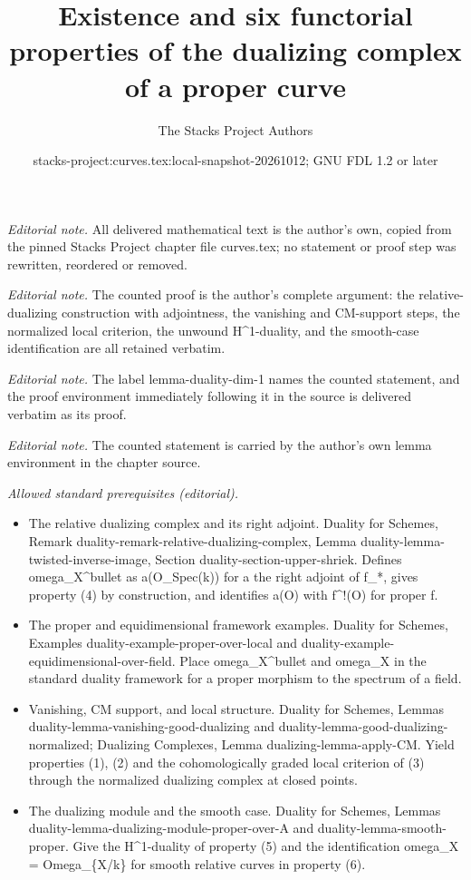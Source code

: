 \documentclass[10pt,a4paper]{amsart}
\title{Existence and six functorial properties of the dualizing complex of a proper curve}
\author{The Stacks Project Authors}
\date{stacks-project:curves.tex:local-snapshot-20261012; GNU FDL 1.2 or later}
\theoremstyle{plain}
\theoremstyle{definition}
\theoremstyle{remark}
\numberwithin{equation}{subsection}
\begin{document}
\maketitle
\noindent\textit{Editorial note.} All delivered mathematical text is the author's own, copied from the pinned Stacks Project chapter file curves.tex; no statement or proof step was rewritten, reordered or removed.\par\medskip
\noindent\textit{Editorial note.} The counted proof is the author's complete argument: the relative-dualizing construction with adjointness, the vanishing and CM-support steps, the normalized local criterion, the unwound H\textasciicircum{}1-duality, and the smooth-case identification are all retained verbatim.\par\medskip
\noindent\textit{Editorial note.} The label lemma-duality-dim-1 names the counted statement, and the proof environment immediately following it in the source is delivered verbatim as its proof.\par\medskip
\noindent\textit{Editorial note.} The counted statement is carried by the author's own lemma environment in the chapter source.\par\medskip
\noindent\textit{Allowed standard prerequisites (editorial).}\begin{itemize}
\item The relative dualizing complex and its right adjoint. Duality for Schemes, Remark duality-remark-relative-dualizing-complex, Lemma duality-lemma-twisted-inverse-image, Section duality-section-upper-shriek. Defines omega\_X\textasciicircum{}bullet as a(O\_Spec(k)) for a the right adjoint of f\_*, gives property (4) by construction, and identifies a(O) with f\textasciicircum{}!(O) for proper f.
\item The proper and equidimensional framework examples. Duality for Schemes, Examples duality-example-proper-over-local and duality-example-equidimensional-over-field. Place omega\_X\textasciicircum{}bullet and omega\_X in the standard duality framework for a proper morphism to the spectrum of a field.
\item Vanishing, CM support, and local structure. Duality for Schemes, Lemmas duality-lemma-vanishing-good-dualizing and duality-lemma-good-dualizing-normalized; Dualizing Complexes, Lemma dualizing-lemma-apply-CM. Yield properties (1), (2) and the cohomologically graded local criterion of (3) through the normalized dualizing complex at closed points.
\item The dualizing module and the smooth case. Duality for Schemes, Lemmas duality-lemma-dualizing-module-proper-over-A and duality-lemma-smooth-proper. Give the H\textasciicircum{}1-duality of property (5) and the identification omega\_X = Omega\_\{X/k\} for smooth relative curves in property (6).
\end{itemize}\medskip
\end{document}
